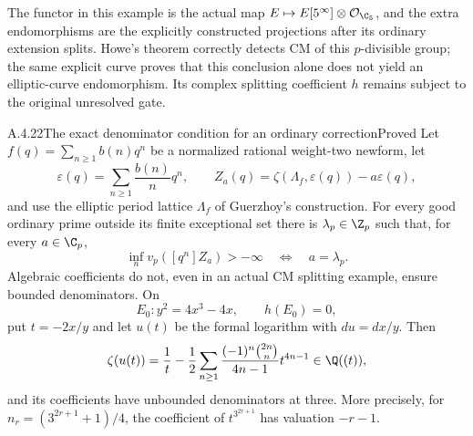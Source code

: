 The functor in this example is the actual map $E\mapsto E[5^\infty]\otimes\mathcal O_{\C_5}$, and the extra endomorphisms are the explicitly constructed projections after its ordinary extension splits. Howe's theorem correctly detects CM of this $p$-divisible group; the same explicit curve proves that this conclusion alone does not yield an elliptic-curve endomorphism. Its complex splitting coefficient $h$ remains subject to the original unresolved gate.

\begin{result}{A.4.22}{The exact denominator condition for an ordinary correction}{Proved}
Let $f(q)=\sum_{n\ge1}b(n)q^n$ be a normalized rational weight-two newform, let
\[
 \varepsilon(q)=\sum_{n\ge1}\frac{b(n)}n q^n,
 \qquad Z_a(q)=\zeta(\Lambda_f,\varepsilon(q))-a\varepsilon(q),
\]
and use the elliptic period lattice $\Lambda_f$ of Guerzhoy's construction. For every good ordinary prime outside its finite exceptional set there is $\lambda_p\in\Z_p$ such that, for every $a\in\C_p$,
\[
 \inf_n v_p([q^n]Z_a)>-\infty
 \quad\Longleftrightarrow\quad a=\lambda_p.
\]
Algebraic coefficients do not, even in an actual CM splitting example, ensure bounded denominators. On
\[
 E_0:y^2=4x^3-4x,\qquad h(E_0)=0,
\]
put $t=-2x/y$ and let $u(t)$ be the formal logarithm with $du=dx/y$. Then
\[
 \zeta(u(t))=\frac1t-\frac12\sum_{n\ge1}
 \frac{(-1)^n\binom{2n}{n}}{4n-1}t^{4n-1}\in\Q((t)),
\]
and its coefficients have unbounded denominators at three. More precisely, for
$n_r=(3^{2r+1}+1)/4$, the coefficient of $t^{3^{2r+1}}$ has valuation $-r-1$.
\end{result}
